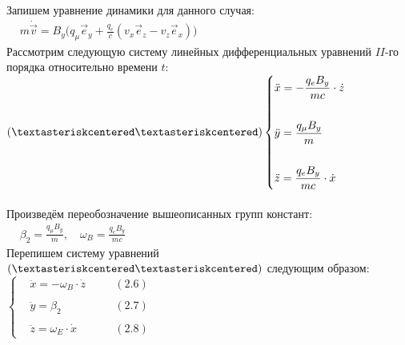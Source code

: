 \documentclass[oneside,final,14pt]{extarticle}
\begin{document}
	\noindent Запишем уравнение динамики для данного случая: \\
	
	\begin{math}
		\begin{aligned}
			& m\dot{\vec{v}} = B_{y}\Big(q_{\mu}\vec{e}_{y} + \frac{q_{e}}{c}\left(v_{x}\vec{e}_{z} - v_{z}\vec{e}_{x}\right)\Big)
		\end{aligned}
	\end{math} \\
	
	\noindent Рассмотрим следующую систему линейных дифференциальных уравнений $II$-го порядка относительно времени $t$: \\
	
	\begin{math}
		(\textasteriskcentered\textasteriskcentered) \left\{
		\begin{aligned}
			& \ddot{x} = -\frac{q_{e}B_{y}}{mc} \cdot \dot{z} \\\\
			& \ddot{y} =  \frac{q_{\mu}B_{y}}{m} \\\\
			& \ddot{z} = \frac{q_{e}B_{y}}{mc} \cdot \dot{x}
		\end{aligned}
		\right.
	\end{math} \\\\
	
	\noindent Произведём переобозначение вышеописанных групп констант: \\
	
	\begin{math}
		\begin{aligned}
			& \beta_{2} = \frac{q_{\mu}B_{y}}{m}, \quad \omega_{B} = \frac{q_{e}B_{y}}{mc}
		\end{aligned}
	\end{math} \\
	
	\noindent Перепишем систему уравнений $(\textasteriskcentered\textasteriskcentered)$ следующим образом: \\
	
	\begin{math}
		\left\{
		\begin{aligned}
			& \ddot{x} = -\omega_{B} \cdot \dot{z} \quad && (2.6) \\\\
			& \ddot{y} = \beta_{2} \quad && (2.7) \\\\
			& \ddot{z} = \omega_{E} \cdot \dot{x} \quad && (2.8)
		\end{aligned}
		\right.
	\end{math} \\
	
\end{document}
